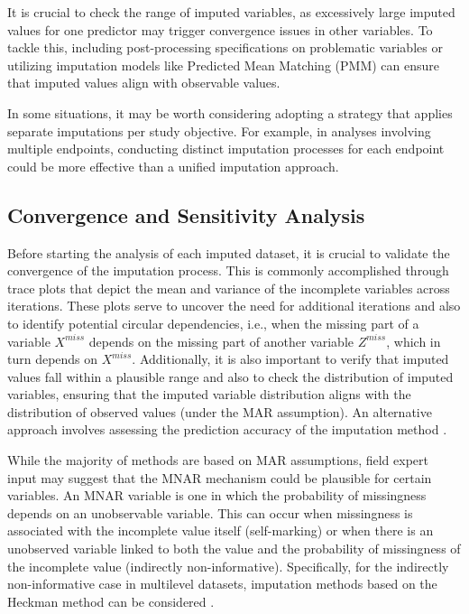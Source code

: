 \documentclass[
  article]{jss}
\begin{document}
It is crucial to check the range of imputed variables, as excessively
large imputed values for one predictor may trigger convergence issues in
other variables. To tackle this, including post-processing
specifications on problematic variables or utilizing imputation models
like Predicted Mean Matching (PMM) can ensure that imputed values align
with observable values.

In some situations, it may be worth considering adopting a strategy that
applies separate imputations per study objective. For example, in
analyses involving multiple endpoints, conducting distinct imputation
processes for each endpoint could be more effective than a unified
imputation approach.

\subsection{Convergence and Sensitivity
Analysis}\label{convergence-and-sensitivity-analysis}

Before starting the analysis of each imputed dataset, it is crucial to
validate the convergence of the imputation process. This is commonly
accomplished through trace plots that depict the mean and variance of
the incomplete variables across iterations. These plots serve to uncover
the need for additional iterations and also to identify potential
circular dependencies, i.e., when the missing part of a variable
\(X^{miss}\) depends on the missing part of another variable
\(Z^{miss}\), which in turn depends on \(X^{miss}\). Additionally, it is
also important to verify that imputed values fall within a plausible
range and also to check the distribution of imputed variables, ensuring
that the imputed variable distribution aligns with the distribution of
observed values (under the MAR assumption). An alternative approach
involves assessing the prediction accuracy of the imputation method
\citep{cai2023}.

While the majority of  methods are based on MAR assumptions,
field expert input may suggest that the MNAR mechanism could be
plausible for certain variables. An MNAR variable is one in which the
probability of missingness depends on an unobservable variable. This can
occur when missingness is associated with the incomplete value itself
(self-marking) or when there is an unobserved variable linked to both
the value and the probability of missingness of the incomplete value
(indirectly non-informative). Specifically, for the indirectly
non-informative case in multilevel datasets, imputation methods based on
the Heckman method can be considered
\citep{hammon2020,hammon2022,munoz2023b}.
\end{document}
